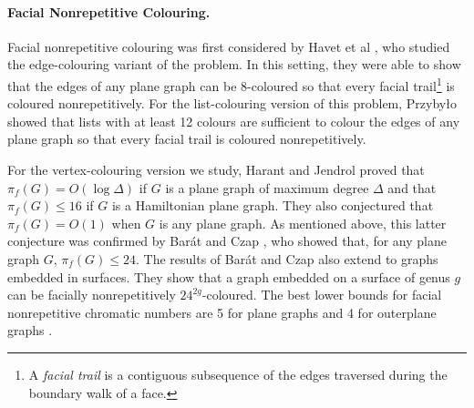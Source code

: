 \documentclass{patmorin}
\begin{document}
\paragraph{Facial Nonrepetitive Colouring.}

Facial nonrepetitive colouring was first considered by Havet et
al \cite{havet2011facial}, who studied the edge-colouring variant
of the problem.  In this setting, they were able to show that
the edges of any plane graph can be 8-coloured so that every facial
trail\footnote{A \emph{facial trail} is a contiguous subsequence of the
edges traversed during the boundary walk of a face.} is coloured
nonrepetitively.  For the list-colouring version of this problem,
Przyby{\l}o \cite{przybylo2013facial} showed that lists with at least
12 colours are sufficient to colour the edges of any plane graph so that
every facial trail is coloured nonrepetitively.

For the vertex-colouring version we study, Harant and Jendrol
\cite{harant2012nonrepetitive} proved that $\pi_f(G)=O(\log\Delta)$ if
$G$ is a plane graph of maximum degree $\Delta$ and that $\pi_f(G)\le
16$ if $G$ is a Hamiltonian plane graph.  They also conjectured that
$\pi_f(G)=O(1)$ when $G$ is any plane graph.  As mentioned above, this
latter conjecture was confirmed by Barát and Czap \cite{barat2013facial},
who showed that, for any plane graph $G$, $\pi_f(G)\le 24$.  The results
of Barát and Czap \cite{barat2013facial} also extend to graphs embedded
in surfaces.  They show that a graph embedded on a surface of genus $g$
can be facially nonrepetitively $24^{2g}$-coloured.  The best lower
bounds for facial nonrepetitive chromatic numbers are 5 for plane graphs
and 4 for outerplane graphs \cite{barat2013facial}.


%
 
\end{document}
